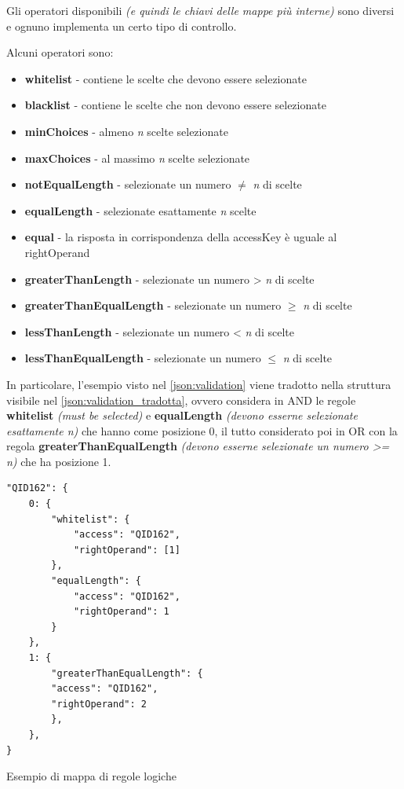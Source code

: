 Gli operatori disponibili \textit{(e quindi le chiavi delle mappe più interne)} sono diversi e ognuno implementa un certo tipo di controllo. 

Alcuni operatori sono:
\begin{itemize}
\item \textbf{whitelist} - contiene le scelte che devono essere selezionate
\item \textbf{blacklist} - contiene le scelte che non devono essere selezionate
\item \textbf{minChoices} - almeno \textit{n} scelte selezionate
\item \textbf{maxChoices} - al massimo \textit{n} scelte selezionate
\item \textbf{notEqualLength} - selezionate un numero $\neq$ \textit{n} di scelte
\item \textbf{equalLength} - selezionate esattamente \textit{n} scelte
\item \textbf{equal} - la risposta in corrispondenza della accessKey è uguale al rightOperand
\item \textbf{greaterThanLength} - selezionate un numero > \textit{n} di scelte
\item \textbf{greaterThanEqualLength} - selezionate un numero $\geq$ \textit{n} di scelte
\item \textbf{lessThanLength} - selezionate un numero < \textit{n} di scelte
\item \textbf{lessThanEqualLength} - selezionate un numero $\leq$ \textit{n} di scelte
\end{itemize}

In particolare, l'esempio visto nel \autoref{json:validation} viene tradotto nella struttura visibile nel \autoref{json:validation_tradotta}, ovvero considera in AND le regole \textbf{whitelist} \textit{(must be selected)} e \textbf{equalLength} \textit{(devono esserne selezionate esattamente n)} che hanno come posizione 0, il tutto considerato poi in OR con la regola \textbf{greaterThanEqualLength} \textit{(devono esserne selezionate un numero >= n)} che ha posizione 1.

\begin{json}
\begin{verbatim}
"QID162": {
    0: {
        "whitelist": {
            "access": "QID162",
            "rightOperand": [1]
        },
        "equalLength": {
            "access": "QID162",
            "rightOperand": 1
        }
    },
    1: {
        "greaterThanEqualLength": {
        "access": "QID162",
        "rightOperand": 2
        },
    },
}
\end{verbatim}
\caption{Esempio di mappa di regole logiche}
\label{json:validation_tradotta}
\end{json}

